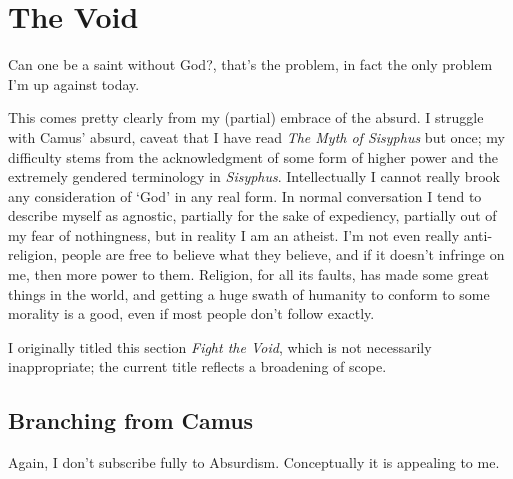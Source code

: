 \documentclass[../butidigress.tex]{subfiles}
\begin{document}
\chapter{The Void}\label{chap:thevoid}
\epigraph{Can one be a saint without God?, that's the problem, in fact the only problem I'm up against today.}{}
\newpage
This comes pretty clearly from my (partial) embrace of the absurd.
I struggle with Camus' absurd, caveat that I have read \textit{The Myth of Sisyphus} but once; my difficulty stems from the acknowledgment of some form of higher power and the extremely gendered terminology in \textit{Sisyphus}.
Intellectually I cannot really brook any consideration of `God' in any real form.
In normal conversation I tend to describe myself as agnostic, partially for the sake of expediency, partially out of my fear of nothingness, but in reality I am an atheist.
I'm not even really anti-religion, people are free to believe what they believe, and if it doesn't infringe on me, then more power to them.
Religion, for all its faults, has made some great things in the world, and getting a huge swath of humanity to conform to some morality is a good, even if most people don't follow exactly.

I originally titled this section \textit{Fight the Void}, which is not necessarily inappropriate; the current title reflects a broadening of scope.

\section{Branching from Camus}
Again, I don't subscribe fully to Absurdism.
Conceptually it is appealing to me.
\end{document}
